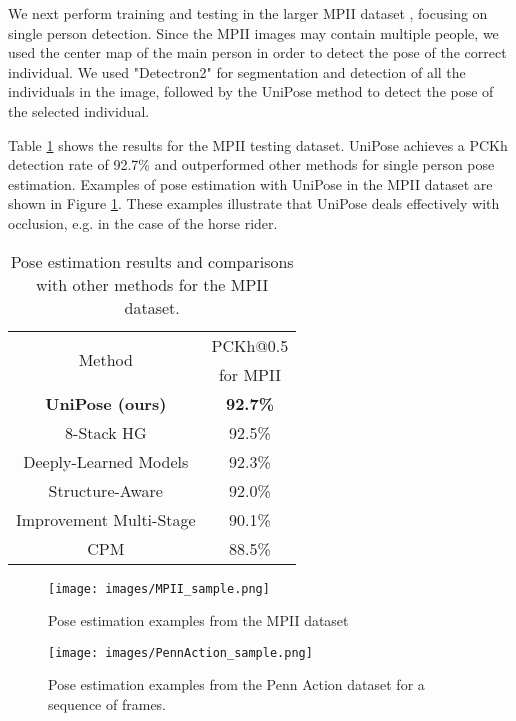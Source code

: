 \documentclass[10pt,twocolumn,letterpaper]{article}
\begin{document}
We next perform training and testing in the larger MPII dataset \cite{MPII}, focusing on single person detection. Since the MPII images may contain multiple people, we used the center map of the main person in order to detect the pose of the correct individual. 
We used "Detectron2" \cite{Detectron} for segmentation and detection of all the individuals in the image, followed by the UniPose method to detect the pose of the selected individual.

Table \ref{tab:MPII} shows the results for the MPII testing dataset. UniPose achieves a PCKh detection rate of 92.7\% and outperformed other methods for single person pose estimation.
Examples of pose estimation with UniPose in the MPII dataset are shown in Figure \ref{fig:MPII_sample}. 
These examples illustrate that UniPose deals effectively with occlusion, e.g. in the case of the horse rider.


\begin{table}[!ht]
\begin{center}
\begin{tabular}{|c|c|}
\hline
    \multirow{2}{*}{Method}&PCKh@0.5\\
    &for MPII\\
\hline\hline
    \textbf{UniPose (ours)}&\textbf{92.7\%}\\
    8-Stack HG \cite{zhang2019human} & 92.5\%\\
    Deeply-Learned Models \cite{DeeplyLearned} & 92.3\%\\
    Structure-Aware \cite{Multi-scale_structureAware} & 92.0\%\\
    Improvement Multi-Stage \cite{su2019improvement} & 90.1\%\\
    CPM \cite{CPM} & 88.5\%\\
\hline
\end{tabular}
\caption{Pose estimation results and comparisons with other methods 
for the MPII dataset.}
\end{center}
\label{tab:MPII}
\end{table}

\begin{figure}[htbp]
\begin{center}
\texttt{[image: images/MPII\_sample.png]}
\end{center}
  \caption{Pose estimation examples from the MPII dataset}
\label{fig:MPII_sample}
\end{figure}

\begin{figure*}[htbp]
\begin{center}
\texttt{[image: images/PennAction\_sample.png]}
\end{center}
  \caption{Pose estimation examples from the Penn Action dataset for a sequence of frames. }
\label{fig:PennAction_sample}
\end{figure*}
\end{document}
